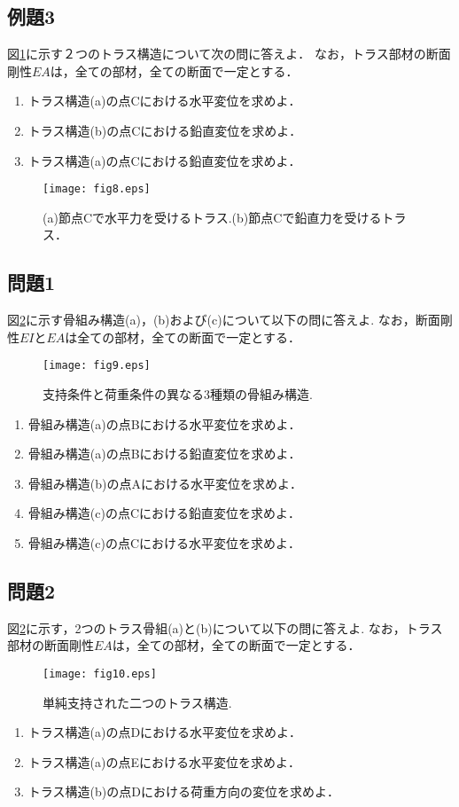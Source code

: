 \documentclass[10pt,a4j]{jarticle}
\begin{document}
\subsection{例題3}
図\ref{fig:fig8}に示す２つのトラス構造について次の問に答えよ．
なお，トラス部材の断面剛性$EA$は，全ての部材，全ての断面で一定とする．
\begin{enumerate}
\item
	トラス構造(a)の点Cにおける水平変位を求めよ．
\item
	トラス構造(b)の点Cにおける鉛直変位を求めよ．
\item
	トラス構造(a)の点Cにおける鉛直変位を求めよ．
\end{enumerate}
\begin{figure}
	\begin{center}
	\texttt{[image: fig8.eps]} 
	\end{center}
	\caption{(a)節点Cで水平力を受けるトラス.(b)節点Cで鉛直力を受けるトラス．}
	\label{fig:fig8}
\end{figure}
\subsection{問題1}
図\ref{fig:fig9}に示す骨組み構造(a)，(b)および(c)について以下の問に答えよ. 
なお，断面剛性$EI$と$EA$は全ての部材，全ての断面で一定とする．
\begin{figure}
	\begin{center}
	\texttt{[image: fig9.eps]} 
	\end{center}
	\caption{支持条件と荷重条件の異なる3種類の骨組み構造.} 
	\label{fig:fig9}
\end{figure}
\begin{enumerate}
\item
	骨組み構造(a)の点Bにおける水平変位を求めよ．
\item
	骨組み構造(a)の点Bにおける鉛直変位を求めよ．
\item
	骨組み構造(b)の点Aにおける水平変位を求めよ．
\item
	骨組み構造(c)の点Cにおける鉛直変位を求めよ．
\item
	骨組み構造(c)の点Cにおける水平変位を求めよ．
\end{enumerate}
\subsection{問題2}
図\ref{fig:fig9}に示す，2つのトラス骨組(a)と(b)について以下の問に答えよ. 
なお，トラス部材の断面剛性$EA$は，全ての部材，全ての断面で一定とする．
\begin{figure}
	\begin{center}
	\texttt{[image: fig10.eps]} 
	\end{center}
	\caption{単純支持された二つのトラス構造.} 
	\label{fig:fig10}
\end{figure}
\begin{enumerate}
\item
	トラス構造(a)の点Dにおける水平変位を求めよ．
\item
	トラス構造(a)の点Eにおける水平変位を求めよ．
\item
	トラス構造(b)の点Dにおける荷重方向の変位を求めよ．
\end{enumerate}
\end{document}
